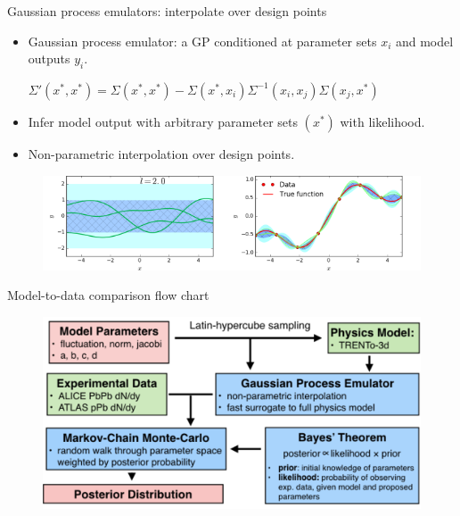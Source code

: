\documentclass[11pt]{beamer}
\begin{document}
\begin{frame}{Gaussian process emulators: interpolate over design points}
\begin{itemize}
\item Gaussian process emulator: a GP conditioned at parameter sets $x_i$ and model outputs $y_i$.
\begin{center}
$\Sigma'(x^*, x^*) = \Sigma(x^*, x^*) - \Sigma(x^*, x_i)\Sigma^{-1}(x_i, x_j)\Sigma(x_j, x^*)$
\end{center}	
\item Infer model output with arbitrary parameter sets $(x^*)$ with likelihood.
\item Non-parametric interpolation over design points.
\end{itemize}
\begin{center}
\begin{figure}
\includegraphics[width = 0.5\textwidth]{./pics/GP-1.png}\includegraphics[width = 0.5\textwidth]{./pics/GP-2.png}
\end{figure}
\end{center}
\end{frame}

\begin{frame}{Model-to-data comparison flow chart}
\begin{center}
\begin{figure}
\includegraphics[width=\textwidth]{./pics/flow-chart.png}
\end{figure}
\end{center}
\end{frame}
\end{document}
